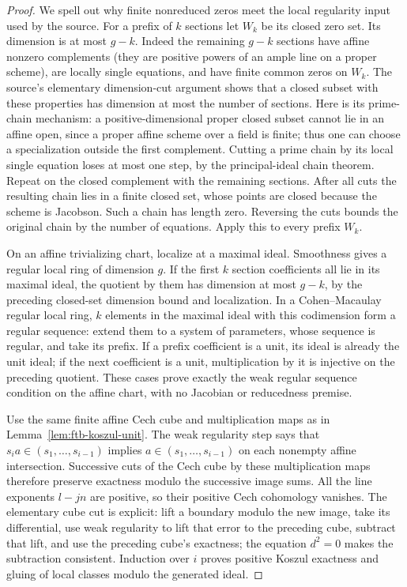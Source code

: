 \begin{proof}
We spell out why finite nonreduced zeros meet the local regularity
input used by the source.  For a prefix of \(k\) sections let \(W_k\)
be its closed zero set.  Its dimension is at most \(g-k\).
Indeed the remaining \(g-k\) sections have affine nonzero
complements (they are positive powers of an ample line on a proper
scheme), are locally single equations, and have finite common
zeros on \(W_k\).  The source's elementary dimension-cut argument
shows that a closed subset with these properties has dimension
at most the number of sections.  Here is its prime-chain mechanism:
a positive-dimensional proper closed subset cannot lie in an affine
open, since a proper affine scheme over a field is finite; thus
one can choose a specialization outside the first complement.
Cutting a prime chain by its local single equation loses at most
one step, by the principal-ideal chain theorem.
Repeat on the closed complement with the remaining sections.
After all cuts the resulting chain lies in a finite closed set,
whose points are closed because the scheme is Jacobson.
Such a chain has length zero.  Reversing the cuts bounds the
original chain by the number of equations.  Apply this to every
prefix \(W_k\).

On an affine trivializing chart, localize at a maximal ideal.
Smoothness gives a regular local ring of dimension \(g\).
If the first \(k\) section coefficients all lie in its maximal
ideal, the quotient by them has dimension at most \(g-k\),
by the preceding closed-set dimension bound and localization.
In a Cohen--Macaulay regular local ring, \(k\) elements in the
maximal ideal with this codimension form a regular sequence:
extend them to a system of parameters, whose sequence is regular,
and take its prefix.
If a prefix coefficient is a unit, its ideal is already the unit
ideal; if the next coefficient is a unit, multiplication by it
is injective on the preceding quotient.
These cases prove exactly the weak regular sequence condition
on the affine chart, with no Jacobian or reducedness premise.

Use the same finite affine Cech cube and multiplication maps as
in Lemma~\ref{lem:ftb-koszul-unit}.
The weak regularity step says that
\(s_i a\in(s_1,\ldots,s_{i-1})\) implies
\(a\in(s_1,\ldots,s_{i-1})\) on each nonempty affine intersection.
Successive cuts of the Cech cube by these multiplication maps
therefore preserve exactness modulo the successive image sums.
All the line exponents \(l-jn\) are positive, so their positive
Cech cohomology vanishes.
The elementary cube cut is explicit: lift a boundary modulo the
new image, take its differential, use weak regularity to lift
that error to the preceding cube, subtract that lift, and use
the preceding cube's exactness; the equation \(d^2=0\) makes
the subtraction consistent.
Induction over \(i\) proves positive Koszul exactness and gluing
of local classes modulo the generated ideal.


\end{proof}
